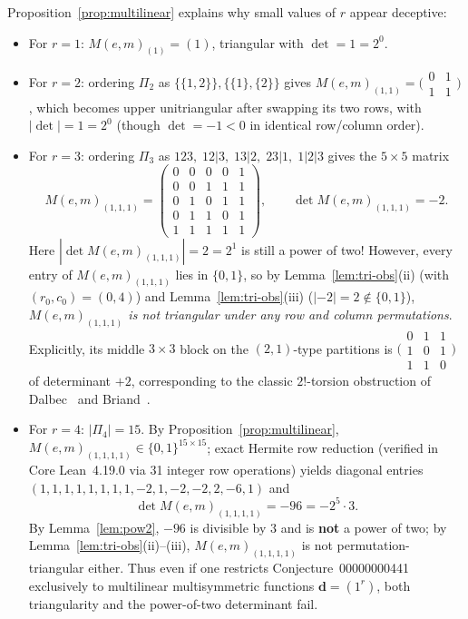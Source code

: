 \documentclass[11pt,a4paper]{article}
\newcommand{\smmat}[1]{\bigl(\begin{smallmatrix}#1\end{smallmatrix}\bigr)}
\theoremstyle{definition}
\theoremstyle{remark}
\newcommand{\vecd}{\mathbf{d}}
\begin{document}
Proposition~\ref{prop:multilinear} explains why small values of $r$ appear deceptive:
\begin{itemize}
  \setlength{\itemsep}{2pt}
  \item For $r = 1$: $M(e,m)_{(1)} = (1)$, triangular with $\det = 1 = 2^0$.
  \item For $r = 2$: ordering $\Pi_2$ as $\{\{1,2\}\}, \{\{1\},\{2\}\}$ gives
  $M(e,m)_{(1,1)} = \smmat{0 & 1 \\ 1 & 1}$, which becomes upper unitriangular after swapping its two rows, with $|\det| = 1 = 2^0$ (though $\det = -1 < 0$ in identical row/column order).
  \item For $r = 3$: ordering $\Pi_3$ as $123,\; 12|3,\; 13|2,\; 23|1,\; 1|2|3$ gives the $5 \times 5$ matrix
  \[
    M(e,m)_{(1,1,1)} =
    \begin{pmatrix}
      0 & 0 & 0 & 0 & 1 \\
      0 & 0 & 1 & 1 & 1 \\
      0 & 1 & 0 & 1 & 1 \\
      0 & 1 & 1 & 0 & 1 \\
      1 & 1 & 1 & 1 & 1
    \end{pmatrix},
    \qquad \det M(e,m)_{(1,1,1)} = -2.
  \]
  Here $|\det M(e,m)_{(1,1,1)}| = 2 = 2^1$ is still a power of two! However, every entry of $M(e,m)_{(1,1,1)}$ lies in $\{0,1\}$, so by Lemma~\ref{lem:tri-obs}(ii) (with $(r_0, c_0) = (0, 4)$) and Lemma~\ref{lem:tri-obs}(iii) ($|-2| = 2 \notin \{0,1\}$), \emph{$M(e,m)_{(1,1,1)}$ is not triangular under any row and column permutations}. Explicitly, its middle $3 \times 3$ block on the $(2,1)$-type partitions is $\smmat{0 & 1 & 1 \\ 1 & 0 & 1 \\ 1 & 1 & 0}$ of determinant $+2$, corresponding to the classic $2!$-torsion obstruction of Dalbec~\cite{Dalbec} and Briand~\cite{Briand}.
  \item For $r = 4$: $|\Pi_4| = 15$. By Proposition~\ref{prop:multilinear}, $M(e,m)_{(1,1,1,1)} \in \{0,1\}^{15 \times 15}$; exact Hermite row reduction (verified in Core Lean~4.19.0 via 31 integer row operations) yields diagonal entries $(1,1,1,1,1,1,1,1,-2,1,-2,-2,2,-6,1)$ and
  \[
    \det M(e,m)_{(1,1,1,1)} = -96 = -2^5 \cdot 3.
  \]
  By Lemma~\ref{lem:pow2}, $-96$ is divisible by $3$ and is \textbf{not} a power of two; by Lemma~\ref{lem:tri-obs}(ii)--(iii), $M(e,m)_{(1,1,1,1)}$ is not permutation-triangular either. Thus even if one restricts Conjecture~00000000441 exclusively to multilinear multisymmetric functions $\vecd = (1^r)$, both triangularity and the power-of-two determinant fail.
\end{itemize}
\end{document}

